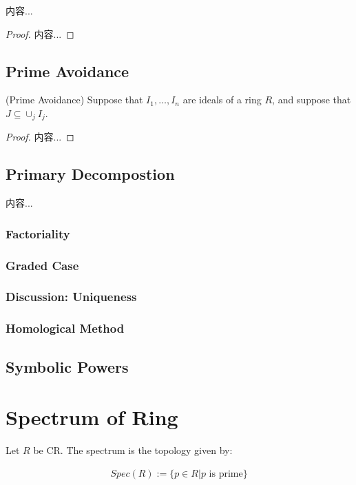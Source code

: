 \documentclass[Total.tex]{subfiles}
\begin{document}
					\begin{corollary}
						内容...
					\end{corollary}
					\begin{proof}
						内容...
					\end{proof}
				\subsection{Prime Avoidance}
					\begin{proposition}
						(Prime Avoidance) Suppose that $I_1,\dots,I_n$ are ideals of a ring $R$, and suppose that $J\subseteq \cup_j I_j$. 
					\end{proposition}
					\begin{proof}
						内容...
					\end{proof}
				\subsection{Primary Decompostion}
					\begin{Def}
						内容...
					\end{Def}
					
					\subsubsection{Factoriality}
					
					\subsubsection{Graded Case}
					\subsubsection{Discussion: Uniqueness}
					
					
					\subsubsection{Homological Method}
				\subsection{Symbolic Powers}
				
			\section{Spectrum of Ring}
			\begin{Def}
				Let $R$ be CR. The spectrum is the topology given by:
				
				\begin{gather*}
					Spec(R):=\{p\in R|p\mbox{ is prime}\}
				\end{gather*}
			\end{Def}
			
\end{document}
